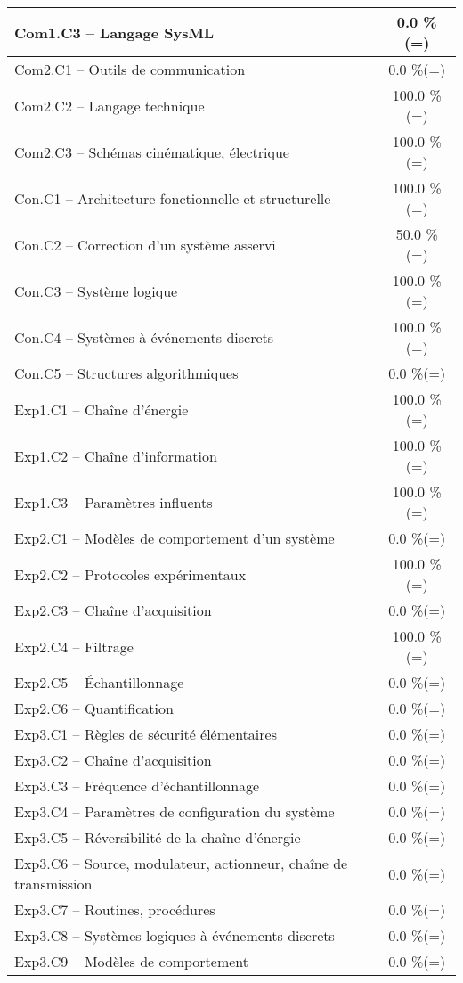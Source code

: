 \begin{center}
\begin{tabular}{|p{.7\linewidth}|c|}
Com1.C3 -- Langage SysML&0.0 \%(=)\\ \hline 
Com2.C1 -- Outils de communication&0.0 \%(=)\\ \hline 
Com2.C2 -- Langage technique&100.0 \%(=)\\ \hline 
Com2.C3 -- Schémas cinématique, électrique&100.0 \%(=)\\ \hline 
Con.C1 -- Architecture fonctionnelle et structurelle&100.0 \%(=)\\ \hline 
Con.C2 -- Correction d’un système asservi&50.0 \%(=)\\ \hline 
Con.C3 -- Système logique&100.0 \%(=)\\ \hline 
Con.C4 -- Systèmes à événements discrets&100.0 \%(=)\\ \hline 
Con.C5 -- Structures algorithmiques&0.0 \%(=)\\ \hline 
Exp1.C1 -- Chaîne d’énergie&100.0 \%(=)\\ \hline 
Exp1.C2 -- Chaîne d’information&100.0 \%(=)\\ \hline 
Exp1.C3 -- Paramètres influents&100.0 \%(=)\\ \hline 
Exp2.C1 -- Modèles de comportement d’un système&0.0 \%(=)\\ \hline 
Exp2.C2 -- Protocoles expérimentaux&100.0 \%(=)\\ \hline 
Exp2.C3 -- Chaîne d’acquisition&0.0 \%(=)\\ \hline 
Exp2.C4 -- Filtrage&100.0 \%(=)\\ \hline 
Exp2.C5 -- Échantillonnage&0.0 \%(=)\\ \hline 
Exp2.C6 -- Quantification&0.0 \%(=)\\ \hline 
Exp3.C1 -- Règles de sécurité élémentaires&0.0 \%(=)\\ \hline 
Exp3.C2 -- Chaîne d'acquisition&0.0 \%(=)\\ \hline 
Exp3.C3 -- Fréquence d’échantillonnage&0.0 \%(=)\\ \hline 
Exp3.C4 -- Paramètres de configuration du système&0.0 \%(=)\\ \hline 
Exp3.C5 -- Réversibilité de la chaîne d’énergie&0.0 \%(=)\\ \hline 
Exp3.C6 -- Source, modulateur, actionneur, chaîne de transmission&0.0 \%(=)\\ \hline 
Exp3.C7 -- Routines, procédures &0.0 \%(=)\\ \hline 
Exp3.C8 -- Systèmes logiques à événements discrets&0.0 \%(=)\\ \hline 
Exp3.C9 -- Modèles de comportement&0.0 \%(=)\\ \hline 

\end{tabular}
\end{center}
